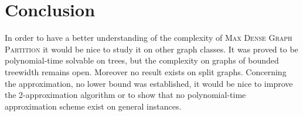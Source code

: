 \documentclass[a4paper,USenglish,cleveref, autoref]{lipics-v2021}
\newcommand\MDGP{\textsc{Max Dense Graph Partition}}
\begin{document}
 
\section{Conclusion}
  In order to have a better understanding of the complexity of  \MDGP{} it would be nice to study it on other graph classes.  It was proved to be polynomial-time solvable on trees, but the complexity on graphs of bounded treewidth  remains open. Moreover no result exists on split graphs. 
  Concerning the approximation, no lower bound was established, it would be nice to improve the 2-approximation algorithm or to show that no polynomial-time approximation scheme exist on general instances. 


\end{document}

